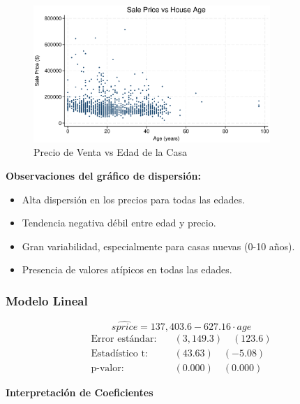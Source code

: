 \documentclass[12pt]{article}
\begin{document}
\begin{figure}[htbp]
    \centering
    \includegraphics[width=0.8\textwidth]{Figures/0205-price_age_scatter.eps}
    \caption{Precio de Venta vs Edad de la Casa}
    \label{fig:price_age_scatter}
\end{figure}

\textbf{Observaciones del gráfico de dispersión:}
\begin{itemize}
    \item Alta dispersión en los precios para todas las edades.
    \item Tendencia negativa débil entre edad y precio.
    \item Gran variabilidad, especialmente para casas nuevas (0-10 años).
    \item Presencia de valores atípicos en todas las edades.
\end{itemize}

\subsubsection*{Modelo Lineal}

\[
\widehat{sprice} = 137,403.6 - 627.16 \cdot age
\]
\begin{align}
\text{Error estándar:} \quad & (3,149.3) \quad (123.6) \\
\text{Estadístico t:} \quad & (43.63) \quad (-5.08) \\
\text{p-valor:} \quad & (0.000) \quad (0.000)
\end{align}

\textbf{Interpretación de Coeficientes}
\end{document}
